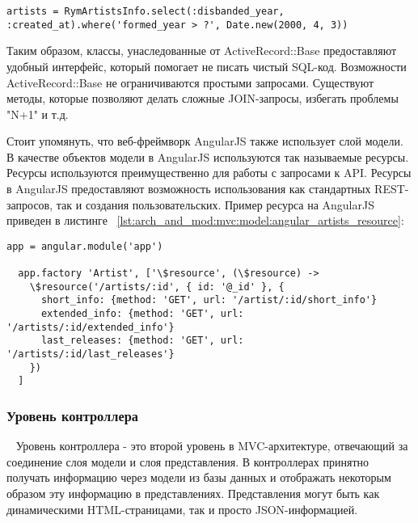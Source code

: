 \begin{lstlisting}[style=fsharpstyle,caption={Пример получения артистов по определённым параметрам}, label=lst:arch_and_mod:mvc:model:select_artist_where_year]
  artists = RymArtistsInfo.select(:disbanded_year, :created_at).where('formed_year > ?', Date.new(2000, 4, 3))
\end{lstlisting}

Таким образом, классы, унаследованные от ActiveRecord::Base предоставляют удобный интерфейс, который помогает не писать чистый SQL-код. Возможности ActiveRecord::Base не ограничиваются простыми запросами. Существуют методы, которые позволяют делать сложные JOIN-запросы, избегать проблемы "N+1" и т.д.

Стоит упомянуть, что веб-фреймворк AngularJS также использует слой модели. В качестве объектов модели в AngularJS используются так называемые ресурсы. Ресурсы используются преимущественно для работы с запросами к API. Ресурсы в AngularJS предоставляют возможность использования как стандартных REST-запросов, так и создания пользовательских. Пример ресурса на AngularJS приведен в листинге ~\ref{lst:arch_and_mod:mvc:model:angular_artists_resource}:

\begin{lstlisting}[style=fsharpstyle,caption={Пример получения артистов по определённым параметрам}, label=lst:arch_and_mod:mvc:model:angular_artists_resource]
  app = angular.module('app')

  app.factory 'Artist', ['\$resource', (\$resource) ->
    \$resource('/artists/:id', { id: '@_id' }, {
      short_info: {method: 'GET', url: '/artist/:id/short_info'}
      extended_info: {method: 'GET', url: '/artists/:id/extended_info'}
      last_releases: {method: 'GET', url: '/artists/:id/last_releases'}
    })
  ]
\end{lstlisting}

\subsubsection{Уровень контроллера}
\label{sub:arch_and_mod:mvc:controller}
~\newline
\indent Уровень контроллера - это второй уровень в MVC-архитектуре, отвечающий за соединение слоя модели и слоя представления. В контроллерах принятно получать информацию через модели из базы данных и отображать некоторым образом эту информацию в представлениях. Представления могут быть как динамическими HTML-страницами, так и просто JSON-информацией.

